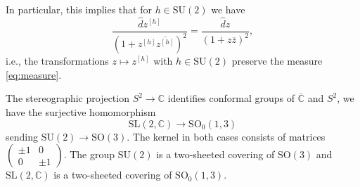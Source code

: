 \documentclass[]{amsart}
\def\SL{\mathrm {SL}}
\def\SU{\mathrm {SU}}
\def\SO{\mathrm  {SO}}
\def\C {{\mathbb C }}
\def\ov{\overline}
\def\wh{\widehat}
\def\sm{\smallskip}
\def\0{{\ov 0}}
\begin{document}
In particular, this implies that for  $h\in \SU(2)$
we have
\begin{equation}
\frac{\wh d z^{[h]}}{(1+ z^{[h]}\ov{z^{[h]}})^2}=
 \frac{\wh d z}{(1+z\ov z )^2},
\label{eq:whdzh}
\end{equation}
i.e., the transformations $z\mapsto z^{[h]}$ 
with $h\in \SU(2)$ preserve the measure \eqref{eq:measure}.






The stereographic projection $S^2\to\C$ identifies
conformal groups of $\ov\C$ and $S^2$, we have the surjective
homomorphism
$$
\SL(2,\C)\to \SO_0(1,3)
$$
sending
$\SU(2)\to \SO(3)$. The kernel in both cases consists of matrices 
$\begin{pmatrix}\pm 1&0\\0&\pm 1 \end{pmatrix}$.
The group $\SU(2)$ is a two-sheeted covering 
of  $\SO(3)$ and $\SL(2,\C)$ is a two-sheeted covering of  $\SO_0(1,3)$.



\sm 
\end{document}

